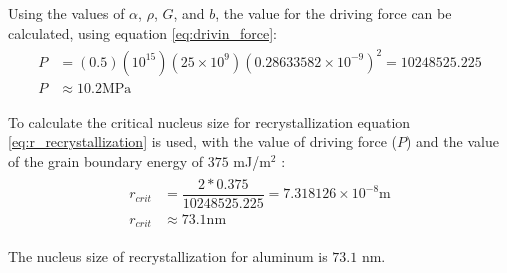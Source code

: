 Using the values of $\alpha$, $\rho$, $G$, and $b$, the value for the driving force can be calculated, using equation \ref{eq:drivin_force}:
\begin{align}
    \label{eq:drivin_force_num}
    \begin{split}
        P&=\left(0.5\right)\left(10^{15}\right)\left(25\times10^9\right)\left(0.28633582\times10^{-9}\right)^2=10248525.225 \\
        P&\approx 10.2 \text{MPa}
    \end{split}
\end{align}

To calculate the critical nucleus size for recrystallization equation \ref{eq:r_recrystallization} is used, with the value of driving force ($P$) and the value of the grain boundary energy of $375$ mJ/m$^2$ \citep[p.~125]{rollett2017recrystallization}:
\begin{align}
    \label{eq:recrystallization_num}
    \begin{split}
        r_{crit}&=\dfrac{2*0.375}{10248525.225} = 7.318126\times10^{-8} \text{m} \\
        r_{crit}&\approx 73.1 \text{nm}
    \end{split}
\end{align}

\begin{mdframed}
    The nucleus size of recrystallization for aluminum is $73.1$ nm.
\end{mdframed}

